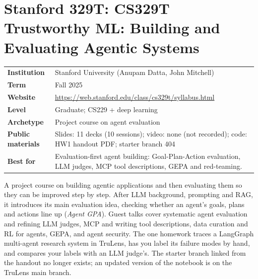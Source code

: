 \documentclass[10pt,oneside]{report}
\begin{document}
\chapter{Stanford 329T: CS329T Trustworthy ML: Building and Evaluating Agentic Systems}\hypertarget{course-S329T}{}
{\small\begin{tabularx}{\linewidth}{@{}>{\bfseries}l X@{}}\toprule
Institution & Stanford University (Anupam Datta, John Mitchell)\\
Term & Fall 2025\\
Website & \href{https://web.stanford.edu/class/cs329t/syllabus.html}{https://web.stanford.edu/class/cs329t/syllabus.html}\\
Level & Graduate; CS229 + deep learning\\
Archetype & Project course on agent evaluation\\
Public materials & Slides: 11 decks (10 sessions); video: none (not recorded); code: HW1 handout PDF; starter branch 404\\
Best for & Evaluation-first agent building: Goal-Plan-Action evaluation, LLM judges, MCP tool descriptions, GEPA and red-teaming.\\
\bottomrule\end{tabularx}}

A project course on building agentic applications and then evaluating them so they can be improved step by step.
After LLM background, prompting and RAG, it introduces its main evaluation idea, checking whether an agent's goals, plans and actions line up (\emph{Agent GPA}).
Guest talks cover systematic agent evaluation and refining LLM judges, MCP and writing tool descriptions, data curation and RL for agents, GEPA, and agent security.
The one homework traces a LangGraph multi-agent research system in TruLens, has you label its failure modes by hand, and compares your labels with an LLM judge's.
The starter branch linked from the handout no longer exists; an updated version of the notebook is on the TruLens main branch.
\end{document}

